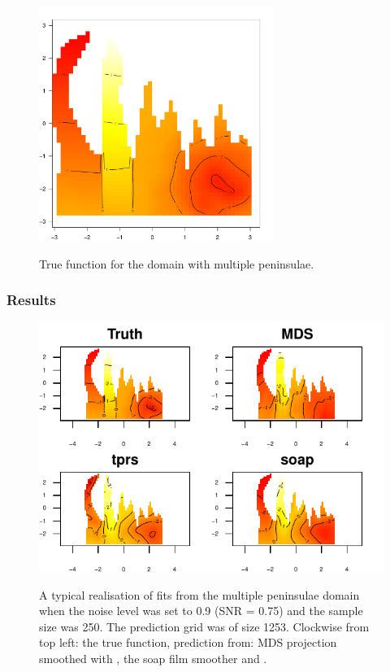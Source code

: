 \begin{figure}
\centering
\includegraphics[width=3in]{mds/figs/wt2-truth.pdf} \\
\caption{True function for the domain with multiple peninsulae.}
\label{wt2-truth}
\end{figure}

\subsubsection{Results}

\begin{figure}
\centering
\includegraphics[width=6in]{mds/figs/wt2-comp-09.pdf} \\
\caption{A typical realisation of fits from the multiple peninsulae domain when the noise level was set to 0.9 (SNR = 0.75) and the sample size was 250. The prediction grid was of size 1253. Clockwise from top left: the true function, prediction from: MDS projection smoothed with \tprs, the soap film smoother and \tprs.\label{cor-4s5}}
\label{wt2-comp-0.9}
\end{figure}

